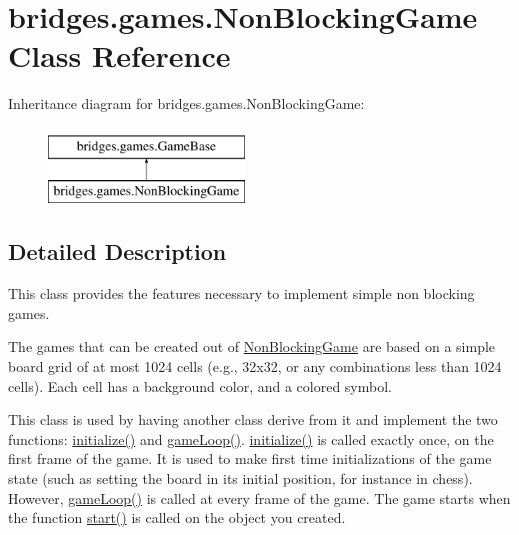 \hypertarget{classbridges_1_1games_1_1_non_blocking_game}{}\section{bridges.\+games.\+Non\+Blocking\+Game Class Reference}
\label{classbridges_1_1games_1_1_non_blocking_game}
Inheritance diagram for bridges.\+games.\+Non\+Blocking\+Game\+:\begin{figure}[H]
\begin{center}
\leavevmode
\includegraphics[height=2.000000cm]{classbridges_1_1games_1_1_non_blocking_game}
\end{center}
\end{figure}


\subsection{Detailed Description}
This class provides the features necessary to implement simple non blocking games. 

The games that can be created out of \hyperlink{classbridges_1_1games_1_1_non_blocking_game}{Non\+Blocking\+Game} are based on a simple board grid of at most 1024 cells (e.\+g., 32x32, or any combinations less than 1024 cells). Each cell has a background color, and a colored symbol.

This class is used by having another class derive from it and implement the two functions\+: \hyperlink{classbridges_1_1games_1_1_game_base_a973a52d5eee7c29b01d668fba3c61657}{initialize()} and \hyperlink{classbridges_1_1games_1_1_game_base_a56d05ed744791cfc1c3792f39ff438f1}{game\+Loop()}. \hyperlink{classbridges_1_1games_1_1_game_base_a973a52d5eee7c29b01d668fba3c61657}{initialize()} is called exactly once, on the first frame of the game. It is used to make first time initializations of the game state (such as setting the board in its initial position, for instance in chess). However, \hyperlink{classbridges_1_1games_1_1_game_base_a56d05ed744791cfc1c3792f39ff438f1}{game\+Loop()} is called at every frame of the game. The game starts when the function \hyperlink{classbridges_1_1games_1_1_non_blocking_game_ac4df60691641278f139d138c7347674a}{start()} is called on the object you created.

